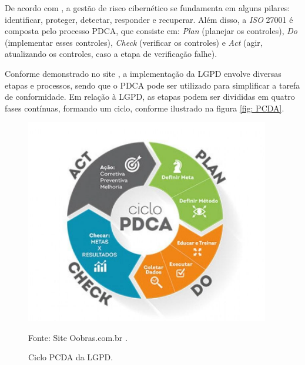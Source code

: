 \documentclass[
	12pt,				%
	openright,			%
	oneside,			%
	a4paper,			%
	english,			%
	french,				%
	spanish,			%
	brazil,				%
	]{abntex2}
\begin{document}
De acordo com , a gestão de risco cibernético se fundamenta em alguns pilares: identificar, proteger, detectar, responder e recuperar. Além disso, a \textit{ISO} 27001 é composta pelo processo PDCA, que consiste em: \textit{Plan} (planejar os controles), \textit{Do} (implementar esses controles), \textit{Check} (verificar os controles) e \textit{Act} (agir, atualizando os controles, caso a etapa de verificação falhe).

Conforme demonstrado no site , a implementação da LGPD envolve diversas etapas e processos, sendo que o PDCA pode ser utilizado para simplificar a tarefa de conformidade. Em relação à LGPD, as etapas podem ser divididas em quatro fases contínuas, formando um ciclo, conforme ilustrado na figura \ref{fig: PCDA}.

\begin{figure}[ht]
    \centering
    \caption{Ciclo PCDA da LGPD.}
    \includegraphics[width=4.2in]{Images/05PCDA.png}
    
    \label{fig: PCDA }
    \centering \small Fonte: Site Oobras.com.br \cite{oobras}.
\end{figure}
\end{document}
